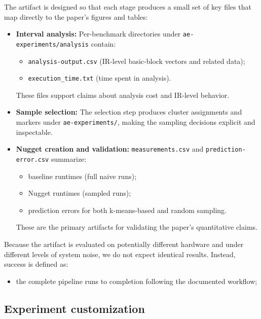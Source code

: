 The artifact is designed so that each stage produces a small set of key files that map directly to the paper's figures and tables:

\begin{itemize}
  \item \textbf{Interval analysis:}  
        Per-benchmark directories under \texttt{ae-experiments/analysis} contain:
        \begin{itemize}
          \item \texttt{analysis-output.csv} (IR-level basic-block vectors and related data);
          \item \texttt{execution\_time.txt} (time spent in analysis).
        \end{itemize}
        These files support claims about analysis cost and IR-level behavior.

  \item \textbf{Sample selection:}  
        The selection step produces cluster assignments and markers under \texttt{ae-experiments/}, making the sampling decisions explicit and inspectable.

  \item \textbf{Nugget creation and validation:}  
        \texttt{measurements.csv} and \texttt{prediction-error.csv} summarize:
        \begin{itemize}
          \item baseline runtimes (full naive runs);
          \item Nugget runtimes (sampled runs);
          \item prediction errors for both k-means-based and random sampling.
        \end{itemize}
        These are the primary artifacts for validating the paper's quantitative claims.
\end{itemize}

Because the artifact is evaluated on potentially different hardware and under different levels of system noise, we do not expect identical results. Instead, success is defined as:
\begin{itemize}
  \item the complete pipeline runs to completion following the documented workflow;
\end{itemize}

\subsection{Experiment customization}

